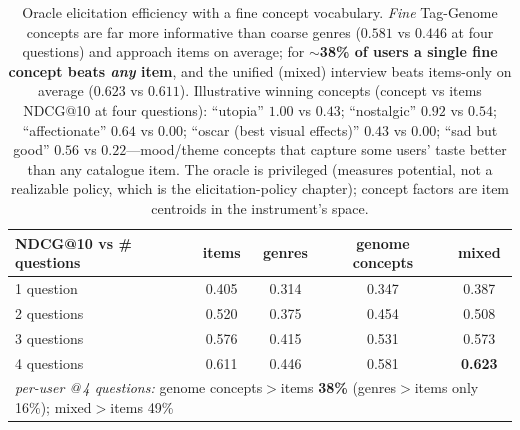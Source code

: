 \begin{table}[h]\centering\small
\begin{tabular}{lcccc}
\toprule
NDCG@10 vs \# questions & items & genres & genome concepts & mixed\\
\midrule
1 question & 0.405 & 0.314 & 0.347 & 0.387\\
2 questions & 0.520 & 0.375 & 0.454 & 0.508\\
3 questions & 0.576 & 0.415 & 0.531 & 0.573\\
4 questions & 0.611 & 0.446 & 0.581 & \textbf{0.623}\\
\midrule
\multicolumn{5}{l}{\emph{per-user @\,4 questions:} genome concepts$>$items \textbf{38\%} (genres$>$items only 16\%); mixed$>$items 49\%}\\
\bottomrule
\end{tabular}
\caption{Oracle elicitation efficiency with a fine concept vocabulary. \emph{Fine} Tag-Genome concepts are far more
informative than coarse genres ($0.581$ vs $0.446$ at four questions) and approach items on average; for
$\sim$\textbf{38\% of users a single fine concept beats \emph{any} item}, and the unified (mixed) interview beats
items-only on average ($0.623$ vs $0.611$). Illustrative winning concepts (concept vs items NDCG@10 at four
questions): ``utopia'' $1.00$ vs $0.43$; ``nostalgic'' $0.92$ vs $0.54$; ``affectionate'' $0.64$ vs $0.00$;
``oscar (best visual effects)'' $0.43$ vs $0.00$; ``sad but good'' $0.56$ vs $0.22$---mood/theme concepts that
capture some users' taste better than any catalogue item. The oracle is privileged (measures potential, not a
realizable policy, which is the elicitation-policy chapter); concept factors are item centroids in the
instrument's space.}
\label{tab:eff}
\end{table}

